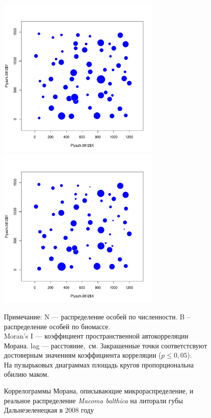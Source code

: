 \begin{figure}[h]
	\begin{minipage}[b]{.46\linewidth}
	\begin{center}
		\includegraphics[width=80mm]{../Barenc_Sea/distribution_Moran/Plyazh0812_N_Macoma_bubbles.pdf}
	\end{center}
	\end{minipage}
	\hfil %
	\begin{minipage}[b]{.46\linewidth}
	\begin{center}
		\includegraphics[width=80mm]{../Barenc_Sea/distribution_Moran/Plyazh0812_B_Macoma_bubbles.pdf}
	\end{center}
	\end{minipage}
	\caption{Коррелограммы Морана, описывающие микрораспределение, и реальное распределение {\it Macoma balthica} на литорали губы Дальнезеленецкая в 2008 году}
	\label{ris:MoranI_DZ_2008}

	\footnotesize{Примечание: N --- распределение особей по численности. B -- распределение особей по биомассе.\\
	Moran's I --- коэффициент пространственной автокорреляции Морана. lag --- расстояние,~см. Закрашенные точки соответстсвуют достоверным значениям коэффициента корреляции ($p \le 0,05$).\\
	На пузырьковых диаграммах площадь кругов пропорциональна обилию маком.}
	\end{figure}
